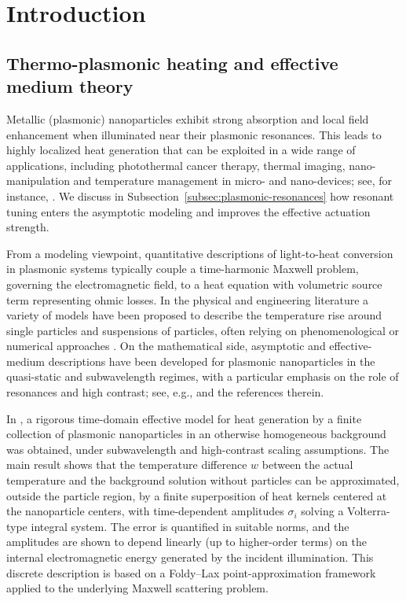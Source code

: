 \documentclass[11pt,a4paper]{article}
\numberwithin{equation}{section}
\theoremstyle{definition}
\newcommand{\1}{\mathbbm{1}}
\begin{document}
\section{Introduction}

\subsection{Thermo-plasmonic heating and effective medium theory}

\noindent Metallic (plasmonic) nanoparticles exhibit strong absorption and local field
enhancement when illuminated near their plasmonic resonances. This leads to
highly localized heat generation that can be exploited in a wide range of
applications, including photothermal cancer therapy, thermal imaging,
nano-manipulation and temperature management in micro- and nano-devices; see,
for instance, \cite{BaffouQuidant2013,BaffouNM2020,Chuang2022,
Jorgensen2016,Kim2023, Vines2019}. We discuss in Subsection~\ref{subsec:plasmonic-resonances} how resonant tuning enters the asymptotic modeling and improves the effective actuation strength.

\noindent From a modeling viewpoint, quantitative descriptions of light-to-heat
conversion in plasmonic systems typically couple a time-harmonic Maxwell
problem, governing the electromagnetic field, to a heat equation with
volumetric source term representing ohmic losses. In the physical and
engineering literature a variety of models have been proposed to describe the
temperature rise around single particles and suspensions of particles, often
relying on phenomenological or numerical approaches
\cite{BaffouQuidant2013,BaffouNM2020,PhotothermalJAP2016,WuSheldon2023}. On
the mathematical side, asymptotic and effective-medium descriptions have been
developed for plasmonic nanoparticles in the quasi-static and subwavelength
regimes, with a particular emphasis on the role of resonances and high
contrast; see, e.g.,
\cite{AmmariMillienRuizZhang2017,AmmariRomeroRuiz2018,
CaoMukherjeeSini2025,Mukherjee2022} and the references therein.

\noindent In \cite{CaoMukherjeeSini2025}, a rigorous time-domain effective model for
heat generation by a finite collection of plasmonic nanoparticles in an
otherwise homogeneous background was obtained, under subwavelength and
high-contrast scaling assumptions. The main result shows that the temperature
difference $w$ between the actual temperature and the background solution
without particles can be approximated, outside the particle region, by a
finite superposition of heat kernels centered at the nanoparticle centers,
with time-dependent amplitudes $\sigma_i$ solving a Volterra-type integral
system. The error is quantified in suitable norms, and the amplitudes are
shown to depend linearly (up to higher-order terms) on the internal
electromagnetic energy generated by the incident illumination. This discrete
description is based on a Foldy--Lax point-approximation framework applied to
the underlying Maxwell scattering problem.
\end{document}
